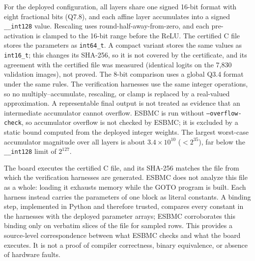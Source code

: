 For the deployed configuration, all layers share one signed 16-bit format with eight fractional bits (Q7.8), and each affine layer accumulates into a signed \texttt{\_\_int128} value. Rescaling uses round-half-away-from-zero, and each pre-activation is clamped to the 16-bit range before the ReLU. The certified C file stores the parameters as \texttt{int64\_t}. A compact variant stores the same values as \texttt{int16\_t}; this changes its SHA-256, so it is not covered by the certificate, and its agreement with the certified file was measured (identical logits on the 7{,}830 validation images), not proved. The 8-bit comparison uses a global Q3.4 format under the same rules. The verification harnesses use the same integer operations, so no multiply--accumulate, rescaling, or clamp is replaced by a real-valued approximation. A representable final output is not treated as evidence that an intermediate accumulator cannot overflow. ESBMC is run without \texttt{--overflow-check}, so accumulator overflow is not checked by ESBMC; it is excluded by a static bound computed from the deployed integer weights. The largest worst-case accumulator magnitude over all layers is about $3.4\times10^{10}$ ($<2^{35}$), far below the \texttt{\_\_int128} limit of $2^{127}$.

The board executes the certified C file, and its SHA-256 matches the file from which the verification harnesses are generated. ESBMC does not analyze this file as a whole: loading it exhausts memory while the GOTO program is built. Each harness instead carries the parameters of one block as literal constants. A binding step, implemented in Python and therefore trusted, compares every constant in the harnesses with the deployed parameter arrays; ESBMC corroborates this binding only on verbatim slices of the file for sampled rows. This provides a source-level correspondence between what ESBMC checks and what the board executes. It is not a proof of compiler correctness, binary equivalence, or absence of hardware faults.

